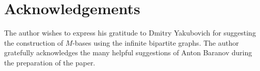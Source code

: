 \documentclass[12pt,oneside,a4paper]{amsart}
\begin{document}
  \bigskip
  \section{Acknowledgements}
    The author wishes to express his gratitude to Dmitry Yakubovich for suggesting the construction of $M$-bases using the infinite bipartite graphs.
    The author gratefully acknowledges the many helpful suggestions of Anton Baranov during the preparation of the paper.

\end{document}
